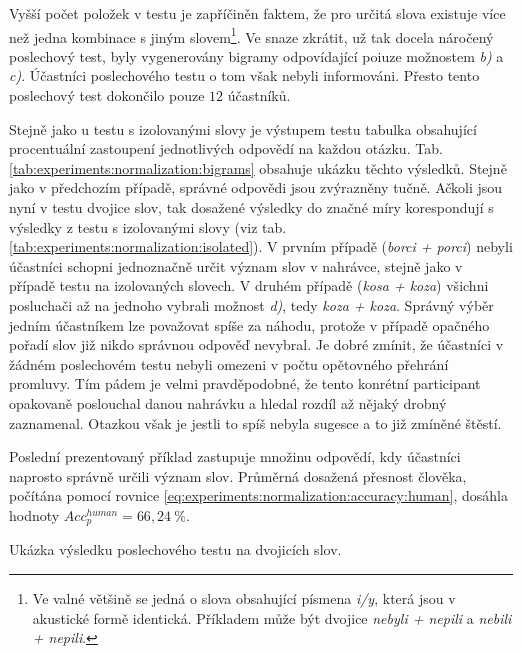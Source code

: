 Vyšší počet položek v testu je zapříčiněn faktem, že pro určitá slova existuje více než jedna kombinace s jiným slovem\footnote{Ve valné většině se jedná o slova obsahující písmena \textit{i/y}, která jsou v akustické formě identická. Příkladem může být dvojice \textit{nebyli + nepili} a \textit{nebili + nepili}.}. Ve snaze zkrátit, už tak docela náročený poslechový test, byly vygenerovány bigramy odpovídající poiuze možnostem \textit{b)} a \textit{c)}. Účastníci poslechového testu o tom však nebyli informováni. Přesto tento poslechový test dokončilo pouze $12$ účastníků.

Stejně jako u testu s izolovanými slovy je výstupem testu tabulka obsahující procentuální zastoupení jednotlivých odpovědí na každou otázku. Tab. \ref{tab:experiments:normalization:bigrams} obsahuje ukázku těchto výsledků. Stejně jako v předchozím případě, správné odpovědi jsou zvýrazněny tučně. Ačkoli jsou nyní v testu dvojice slov, tak dosažené výsledky do značné míry korespondují s výsledky z testu s izolovanými slovy (viz tab. \ref{tab:experiments:normalization:isolated}). V prvním případě (\textit{borci + porci}) nebyli účastníci schopni jednoznačně určit význam slov v nahrávce, stejně jako v případě testu na izolovaných slovech. V druhém případě (\textit{kosa + koza}) všichni posluchači až na jednoho vybrali možnost \textit{d)}, tedy \textit{koza + koza}. Správný výběr jedním účastníkem lze považovat spíše za náhodu, protože v případě opačného pořadí slov již nikdo správnou odpověď nevybral. Je dobré zmínit, že účastníci v žádném poslechovém testu nebyli omezeni v počtu opětovného přehrání promluvy. Tím pádem je velmi pravděpodobné, že tento konrétní participant opakovaně poslouchal danou nahrávku a hledal rozdíl až nějaký drobný zaznamenal. Otazkou však je jestli to spíš nebyla sugesce a to již zmíněné štěstí.

Poslední prezentovaný příklad zastupuje množinu odpovědí, kdy účastníci naprosto správně určili význam slov. Průměrná dosažená přesnost člověka, počítána pomocí rovnice \ref{eq:experiments:normalization:accuracy:human}, dosáhla hodnoty $Acc_{p}^{human} = 66,24\ \%$.

\begin{table}[htpb]
  \centering
  \def\arraystretch{1.5}
  \caption{Ukázka výsledku poslechového testu na dvojicích slov.}
  \label{tab:experiments:normalization:bigrams}
\end{table}


